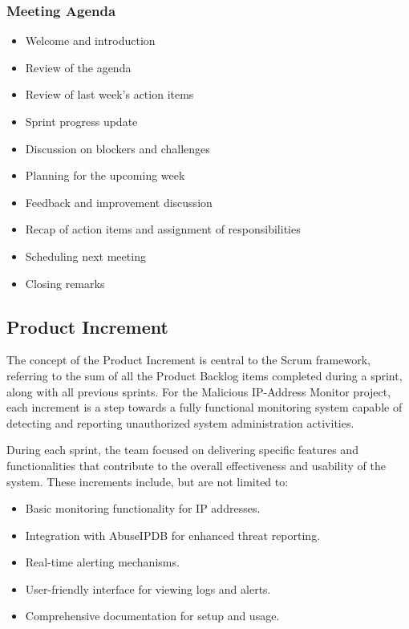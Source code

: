 \documentclass[11pt,a4paper]{article}
\begin{document}
    \subsubsection{Meeting Agenda}\label{subsubsec:meeting-agenda}
    \begin{itemize}
        \item Welcome and introduction
        \item Review of the agenda
        \item Review of last week's action items
        \item Sprint progress update
        \item Discussion on blockers and challenges
        \item Planning for the upcoming week
        \item Feedback and improvement discussion
        \item Recap of action items and assignment of responsibilities
        \item Scheduling next meeting
        \item Closing remarks
    \end{itemize}

    \subsection{Product Increment}\label{subsec:product-increment}
    The concept of the Product Increment is central to the Scrum framework, referring to the sum of all the Product Backlog items completed during a sprint, along with all previous sprints. For the Malicious IP-Address Monitor project, each increment is a step towards a fully functional monitoring system capable of detecting and reporting unauthorized system administration activities.

    During each sprint, the team focused on delivering specific features and functionalities that contribute to the overall effectiveness and usability of the system. These increments include, but are not limited to:

    \begin{itemize}
        \item Basic monitoring functionality for IP addresses.
        \item Integration with AbuseIPDB for enhanced threat reporting.
        \item Real-time alerting mechanisms.
        \item User-friendly interface for viewing logs and alerts.
        \item Comprehensive documentation for setup and usage.
    \end{itemize}
\end{document}
